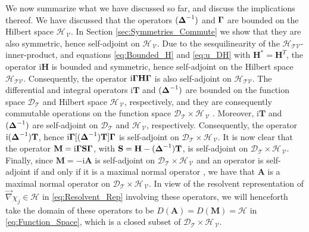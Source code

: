 \documentclass[11pt]{amsart}
\newcommand{\I}{\mathrm{i}}
\newcommand{\Mb}{\mathbf{M}}
\newcommand{\Tb}{\mathbf{T}}
\newcommand{\Hb}{\mathbf{H}}
\newcommand{\Sb}{\mathbf{S}}
\newcommand{\Ab}{\mathbf{A}}
\newcommand{\Tc}{\mathcal{T}}
\newcommand{\Vc}{\mathcal{V}}
\newcommand{\Hs}{\mathscr{H}}
\newcommand{\Ds}{\mathscr{D}}
\newcommand\bDelta{\mbox{\boldmath${\Delta}$}}
\newcommand\bGamma{\mbox{\boldmath${\Gamma}$}}
\begin{document}
We now summarize what we have discussed so far, and
discuss the implications thereof. We have discussed that the 
operators $(\bDelta^{-1})$ and $\bGamma$ are bounded on the Hilbert
space $\Hs_{\,\Vc}$. In Section \ref{sec:Symmetries_Commute} we show
that they are also symmetric, hence self-adjoint on $\Hs_{\,\Vc}$. Due
to the sesquilinearity of the $\Hs_{\Tc\Vc}$-inner-product, and
equations \eqref{eq:Bounded_H} and \eqref{eq:u_DH} with $\Hb^*=\Hb^T$,
the  operator $\I\Hb$ is bounded and symmetric, hence self-adjoint on
the Hilbert space $\Hs_{\Tc\Vc}$.  Consequently, the operator
$\I\bGamma\Hb\bGamma$ is also self-adjoint on $\Hs_{\Tc\Vc}$. The
differential and integral operators $\I\Tb$ and $(\bDelta^{-1})$ are 
bounded on the function space $\Ds_{\Tc}$ and Hilbert space $\Hs_{\,\Vc}$,
respectively, and they are consequently commutable operations on the
function space $\Ds_{\Tc}\times\Hs_{\,\Vc}$ \cite{Folland:99}. Moreover,
$\I\Tb$ and $(\bDelta^{-1})$ are self-adjoint on
$\Ds_{\Tc}$ and $\Hs_{\,\Vc}$, respectively. Consequently, the operator 
$\I(\bDelta^{-1})\Tb$, hence $\I\bGamma[(\bDelta^{-1})\Tb]\bGamma$ is
self-adjoint on $\Ds_{\Tc}\times\Hs_{\,\Vc}$. It is now clear that the operator
$\Mb=\I\bGamma\Sb\bGamma$, with $\Sb=\Hb-(\bDelta^{-1})\Tb$, is
self-adjoint on $\Ds_{\Tc}\times\Hs_{\,\Vc}$. Finally, since $\Mb=-\I\Ab$ is
self-adjoint on $\Ds_{\Tc}\times\Hs_{\,\Vc}$ and an operator is
self-adjoint if and only if it is a maximal normal operator
\cite{Stone:64}, we have that $\Ab$ is a maximal normal
operator on $\Ds_{\Tc}\times\Hs_{\,\Vc}$. In view of the resolvent
representation of $\vec{\nabla}\chi_j\in\Hs$ in \eqref{eq:Resolvent_Rep}
involving these operators, we will henceforth take the domain of
these operators to be $D(\Ab)=D(\Mb)=\Hs$ in
\eqref{eq:Function_Space}, which is a closed subset of
$\Ds_{\Tc}\times\Hs_{\,\Vc}$.   
\end{document}
